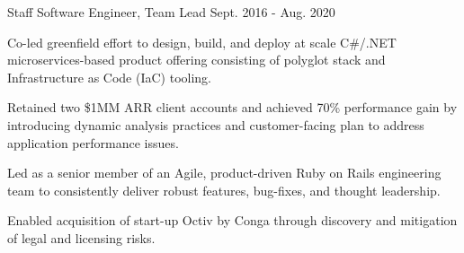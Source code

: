 \begin{cventries}
  \cventry
    {Staff Software Engineer, Team Lead} %
    {} %
    {} %
    {Sept. 2016 - Aug. 2020} %
    {
      \begin{cvitems} %
      \item {Co-led greenfield effort to design, build, and deploy at scale C\#/.NET microservices-based product offering consisting of polyglot stack and Infrastructure as Code (IaC) tooling.}
        \item {Retained two \$1MM ARR client accounts and achieved 70\% performance gain by introducing dynamic analysis practices and customer-facing plan to address application performance issues.}
        \item {Led as a senior member of an Agile, product-driven Ruby on Rails engineering team to consistently deliver robust features, bug-fixes, and thought leadership.}
        \item {Enabled acquisition of start-up Octiv by Conga through discovery and mitigation of legal and licensing risks.}
      \end{cvitems}
    }
    


\end{cventries}
